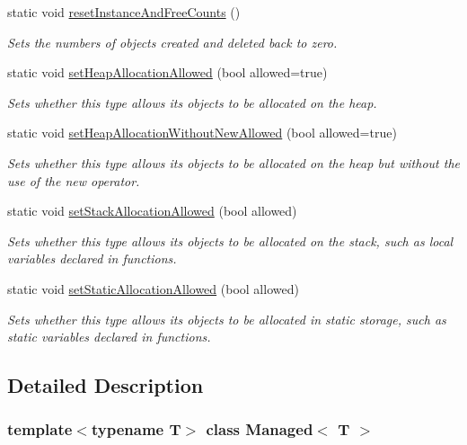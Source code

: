 \begin{DoxyCompactItemize}
static void \mbox{\hyperlink{classManaged_a0c190bc9c1baf9176a72b63e3ba0d985}{reset\+Instance\+And\+Free\+Counts}} ()
\begin{DoxyCompactList}\small\item\em Sets the numbers of objects created and deleted back to zero. \end{DoxyCompactList}\item 
static void \mbox{\hyperlink{classManaged_a63f381f9b36ca3cfb6ff93de9deb8d4c}{set\+Heap\+Allocation\+Allowed}} (bool allowed=true)
\begin{DoxyCompactList}\small\item\em Sets whether this type allows its objects to be allocated on the heap. \end{DoxyCompactList}\item 
static void \mbox{\hyperlink{classManaged_a51650b1dc51e20f1c7e846883a0d9467}{set\+Heap\+Allocation\+Without\+New\+Allowed}} (bool allowed=true)
\begin{DoxyCompactList}\small\item\em Sets whether this type allows its objects to be allocated on the heap but without the use of the \textquotesingle{}new\textquotesingle{} operator. \end{DoxyCompactList}\item 
static void \mbox{\hyperlink{classManaged_aafc988bee6bf29534c249cf50b6107fc}{set\+Stack\+Allocation\+Allowed}} (bool allowed)
\begin{DoxyCompactList}\small\item\em Sets whether this type allows its objects to be allocated on the stack, such as local variables declared in functions. \end{DoxyCompactList}\item 
static void \mbox{\hyperlink{classManaged_a0322175a93f8a3246e9ef1ade5718493}{set\+Static\+Allocation\+Allowed}} (bool allowed)
\begin{DoxyCompactList}\small\item\em Sets whether this type allows its objects to be allocated in static storage, such as static variables declared in functions. \end{DoxyCompactList}\end{DoxyCompactItemize}


\subsection{Detailed Description}
\subsubsection*{template$<$typename T$>$\newline
class Managed$<$ T $>$}

